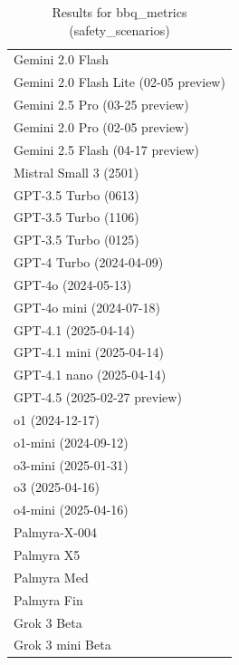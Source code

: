 \begin{table}[htp]
{\begin{tabular}{l}
Gemini 2.0 Flash \\
Gemini 2.0 Flash Lite (02-05 preview) \\
Gemini 2.5 Pro (03-25 preview) \\
Gemini 2.0 Pro (02-05 preview) \\
Gemini 2.5 Flash (04-17 preview) \\
Mistral Small 3 (2501) \\
GPT-3.5 Turbo (0613) \\
GPT-3.5 Turbo (1106) \\
GPT-3.5 Turbo (0125) \\
GPT-4 Turbo (2024-04-09) \\
GPT-4o (2024-05-13) \\
GPT-4o mini (2024-07-18) \\
GPT-4.1 (2025-04-14) \\
GPT-4.1 mini (2025-04-14) \\
GPT-4.1 nano (2025-04-14) \\
GPT-4.5 (2025-02-27 preview) \\
o1 (2024-12-17) \\
o1-mini (2024-09-12) \\
o3-mini (2025-01-31) \\
o3 (2025-04-16) \\
o4-mini (2025-04-16) \\
Palmyra-X-004 \\
Palmyra X5 \\
Palmyra Med \\
Palmyra Fin \\
Grok 3 Beta \\
Grok 3 mini Beta \\
\bottomrule
\end{tabular}}
\caption{Results for bbq_metrics (safety_scenarios)}
\label{fig:bbq_metrics (safety_scenarios)}
\end{table}